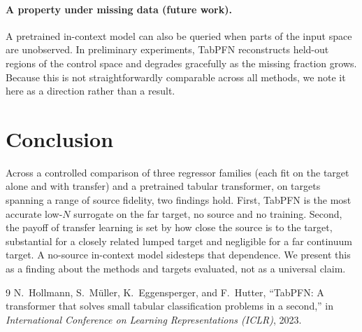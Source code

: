 \documentclass[11pt]{article}
\begin{document}
\paragraph{A property under missing data (future work).}
A pretrained in-context model can also be queried when parts of the input space
are unobserved. In preliminary experiments, TabPFN reconstructs held-out regions
of the control space and degrades gracefully as the missing fraction grows.
Because this is not straightforwardly comparable across all methods, we note it
here as a direction rather than a result.

\section{Conclusion}

Across a controlled comparison of three regressor families (each fit on the target
alone and with transfer) and a pretrained tabular transformer, on targets spanning
a range of source fidelity, two findings hold. First, TabPFN is the most accurate
low-$N$ surrogate on the far target, no source and no training. Second, the payoff
of transfer learning is set by how close the source is to the target, substantial
for a closely related lumped target and negligible for a far continuum target. A
no-source in-context model sidesteps that dependence. We present this as a finding
about the methods and targets evaluated, not as a universal claim.

\begin{thebibliography}{9}
N.~Hollmann, S.~M\"uller, K.~Eggensperger, and F.~Hutter,
``TabPFN: A transformer that solves small tabular classification problems in a
second,'' in \emph{International Conference on Learning Representations (ICLR)},
2023.
\end{thebibliography}
\end{document}
